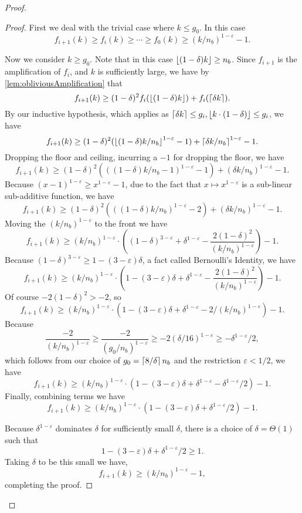 \begin{proof}
\begin{proof}
  First we deal with the trivial
  case where $k \le g_0$. In this case
  $$f_{i+1}(k) \ge f_i(k) \ge \cdots \ge f_0(k) \ge (k/n_b)^{1-\varepsilon} -1.$$

  Now we consider $k \ge g_0$. Note that in this case $\left\lfloor (1-\delta)k \right\rfloor \ge n_b$.
  Since $f_{i+1}$ is the amplification of $f_i$, and $k$ is sufficiently large, we have by \cref{lem:obliviousAmplification} that
  $$f_{i+1}(k) \ge (1-\delta)^2 f_i(\left\lfloor (1-\delta)k \right\rfloor) + f_i(\left\lceil \delta k \right\rceil).$$
  By our inductive hypothesis, which applies as $\left\lceil \delta k \right\rceil\le g_i, \left\lfloor k\cdot (1-\delta) \right\rfloor \le g_i$, we have
  $$f_{i+1}(k) \ge (1-\delta)^2 (\left\lfloor (1-\delta)k/n_b \right\rfloor^{1-\varepsilon}-1) + \left\lceil \delta k/n_b \right\rceil^{1-\varepsilon} - 1. $$
  Dropping the floor and ceiling, incurring a $-1$ for dropping the floor, we have
  $$f_{i+1}(k) \ge (1-\delta)^2 (((1-\delta)k/n_b-1)^{1-\varepsilon}-1) + (\delta k/n_b)^{1-\varepsilon} - 1.$$
  Because $(x-1)^{1-\varepsilon} \ge x^{1-\varepsilon} -1$, due to the
  fact that $x\mapsto x^{1-\varepsilon}$ is a sub-linear
  sub-additive function, we have 
  $$f_{i+1}(k) \ge (1-\delta)^2 (((1-\delta)k/n_b)^{1-\varepsilon}-2) + (\delta k/n_b)^{1-\varepsilon}-1.$$
  Moving the $(k/n_b)^{1-\varepsilon}$ to the front we have
  $$ f_{i+1}(k) \ge (k/n_b)^{1-\varepsilon} \cdot\left((1-\delta)^{3-\varepsilon} + \delta^{1-\varepsilon} - \frac{2(1-\delta)^2}{(k/n_b)^{1-\varepsilon}} \right) -1.$$
  Because $(1-\delta)^{3-\varepsilon} \ge 1-(3-\varepsilon)\delta$, a fact called Bernoulli's Identity, we have
  $$f_{i+1}(k) \ge (k/n_b)^{1-\varepsilon} \cdot\left(1-(3-\varepsilon)\delta + \delta^{1-\varepsilon} - \frac{2(1-\delta)^2}{(k/n_b)^{1-\varepsilon}} \right)-1.$$
  Of course $-2(1-\delta)^2 > -2$, so 
  $$f_{i+1}(k) \ge (k/n_b)^{1-\varepsilon} \cdot\left(1-(3-\varepsilon)\delta + \delta^{1-\varepsilon} - 2/(k/n_b)^{1-\varepsilon} \right) -1.$$
  Because $$\frac{-2}{(k/n_b)^{1-\varepsilon}} \ge \frac{-2}{(g_0/n_b)^{1-\varepsilon}} \ge -2(\delta/16)^{1-\varepsilon} \ge -\delta^{1-\varepsilon}/2,$$
  which follows from our choice of $g_0 = \left\lceil 8/\delta \right\rceil n_b$ and the restriction
  $\varepsilon<1/2$, we have 
  $$f_{i+1}(k) \ge (k/n_b)^{1-\varepsilon} \cdot\left(1-(3-\varepsilon)\delta + \delta^{1-\varepsilon} - \delta^{1-\varepsilon}/2 \right)-1.$$
  Finally, combining terms we have
  $$f_{i+1}(k) \ge  (k/n_b)^{1-\varepsilon} \cdot\left(1-(3-\varepsilon)\delta + \delta^{1-\varepsilon}/2\right)-1. $$

  Because $\delta^{1-\varepsilon}$ dominates $\delta$ for
  sufficiently small $\delta$, there is a choice of
  $\delta=\Theta(1)$ such that 
  $$1-(3-\varepsilon)\delta + \delta^{1-\varepsilon}/2 \ge 1.$$ 
  Taking $\delta$ to be this small we have,
  $$f_{i+1}(k) \ge (k/n_b)^{1-\varepsilon}-1,$$
  completing the proof. 
  \end{proof}


\end{proof}
